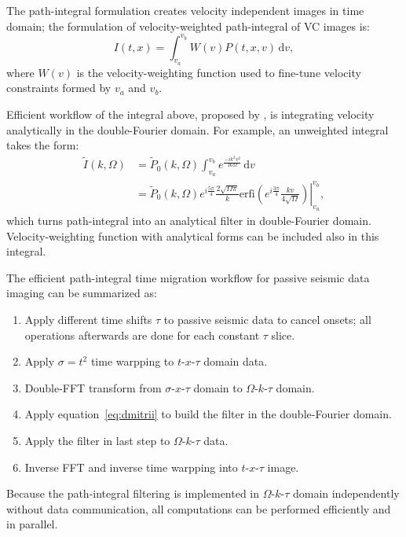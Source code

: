 The path-integral formulation creates velocity independent images \cite[]{landa2006path} in time domain; the formulation of velocity-weighted path-integral of VC images is:
\begin{equation}
I(t,x) = \int_{v_a}^{v_b} W(v)P(t,x,v)\,\mathrm{d}v,
\label{eq:int}
\end{equation}
where $W(v)$ is the velocity-weighting function used to fine-tune velocity constraints formed by $v_a$ and $v_b$.

Efficient workflow of the integral above, proposed by \cite{merzlikin2015efficient}, is integrating velocity analytically in the double-Fourier domain.
For example, an unweighted integral takes the form:
\begin{equation}
\begin{aligned}
\tilde I(k,\Omega) &= \tilde P_0(k,\Omega)
    \int_{v_a}^{v_b}e^{\frac{-ik^2v^2}{16\Omega}}\,\mathrm{d}v \\
&= \tilde P_0(k,\Omega) e^{i\frac{5\pi}{4}}\frac{2\sqrt{\Omega\pi}}{k}
\left.\mathrm{erfi}(e^{i\frac{3\pi}{4}}\frac{kv}{4\sqrt{\Omega}})
\right\rvert_{v_a}^{v_b},
\label{eq:dmitrii}
\end{aligned}
\end{equation}
which turns path-integral into an analytical filter in double-Fourier domain.
Velocity-weighting function with analytical forms can be included also in this integral.

The efficient path-integral time migration workflow for passive seismic data imaging can be summarized as:
\begin{enumerate}
\item Apply different time shifts $\tau$ to passive seismic data to cancel onsets; all operations afterwards are done for each constant $\tau$ slice.
\item Apply $\sigma=t^2$ time warpping to $t$-$x$-$\tau$ domain data.
\item Double-FFT transform from $\sigma$-$x$-$\tau$ domain to $\Omega$-$k$-$\tau$ domain.
\item Apply equation~\ref{eq:dmitrii} to build the filter in the double-Fourier domain.
\item Apply the filter in last step to $\Omega$-$k$-$\tau$ data.
\item Inverse FFT and inverse time warpping into $t$-$x$-$\tau$ image.
\end{enumerate}

Because the path-integral filtering is implemented in $\Omega$-$k$-$\tau$ domain independently without data communication, all computations can be performed efficiently and in parallel.

